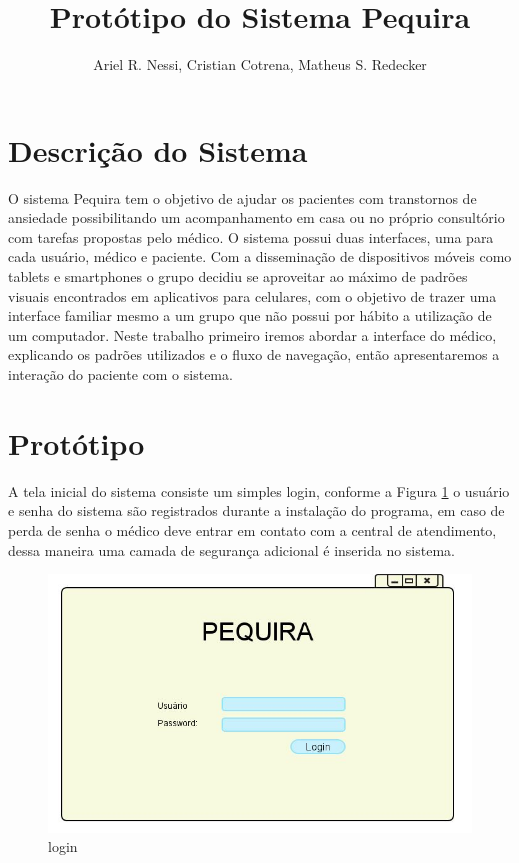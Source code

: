 \documentclass[12pt]{article}
\title{Protótipo do Sistema Pequira}
\author{Ariel R. Nessi\inst{1}, Cristian Cotrena\inst{1}, Matheus S. Redecker\inst{1} }
\begin{document}
 

\maketitle

\section{Descrição do Sistema}
O sistema Pequira tem o objetivo de ajudar os pacientes com transtornos de ansiedade possibilitando um acompanhamento em casa ou no próprio consultório com tarefas propostas pelo médico. O sistema possui duas interfaces, uma para cada usuário, médico e paciente. Com a disseminação de dispositivos móveis como tablets e smartphones o grupo decidiu se aproveitar ao máximo de padrões visuais encontrados em aplicativos para celulares, com o objetivo de trazer uma interface familiar mesmo a um grupo que não possui por hábito a utilização de um computador. Neste trabalho primeiro iremos abordar a interface do médico, explicando os padrões utilizados e o fluxo de navegação, então apresentaremos a interação do paciente com o sistema.

\section{Protótipo}
A tela inicial do sistema consiste um simples login, conforme a Figura \ref{login} o usuário e senha do sistema são registrados durante a instalação do programa, em caso de perda de senha o médico deve entrar em contato com a central de atendimento, dessa maneira uma camada de segurança adicional é inserida no sistema.

\begin{figure}[h]
\centering
\includegraphics[scale=0.4]{imagens/1Log_In.jpg}
\caption{login}
\label{login}
\end{figure}
\end{document}
